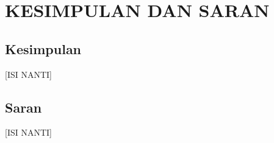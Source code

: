 \chapter{KESIMPULAN DAN SARAN}\label{kesimpulan-dan-saran}

\section{Kesimpulan}
[ISI NANTI]

\section{Saran}
[ISI NANTI]
